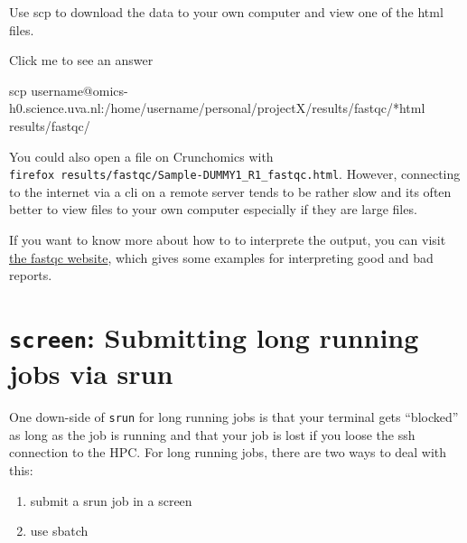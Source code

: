 \documentclass[
  letterpaper,
  DIV=11,
  numbers=noendperiod]{scrreprt}
\newenvironment{Shaded}{}{}
\newcommand{\FunctionTok}[1]{\textcolor[rgb]{0.44,0.26,0.76}{#1}}
\newcommand{\NormalTok}[1]{\textcolor[rgb]{0.14,0.16,0.18}{#1}}
\newcommand{\PreprocessorTok}[1]{\textcolor[rgb]{0.84,0.23,0.29}{#1}}
\providecommand{\tightlist}{%
  \setlength{\itemsep}{0pt}\setlength{\parskip}{0pt}}\usepackage{longtable,booktabs,array}
\begin{document}
\begin{tcolorbox}[enhanced jigsaw, coltitle=black, leftrule=.75mm, colback=white, toptitle=1mm, breakable, toprule=.15mm, colbacktitle=quarto-callout-caution-color!10!white, bottomtitle=1mm, arc=.35mm, opacitybacktitle=0.6, bottomrule=.15mm, titlerule=0mm, title=\textcolor{quarto-callout-caution-color}{\faFire}\hspace{0.5em}{Exercise}, rightrule=.15mm, left=2mm, colframe=quarto-callout-caution-color-frame, opacityback=0]

Use scp to download the data to your own computer and view one of the
html files.

Click me to see an answer

\begin{Shaded}
\begin{Highlighting}[]
\FunctionTok{scp}\NormalTok{ username@omics{-}h0.science.uva.nl:/home/username/personal/projectX/results/fastqc/}\PreprocessorTok{*}\NormalTok{html results/fastqc/}
\end{Highlighting}
\end{Shaded}

You could also open a file on Crunchomics with
\texttt{firefox\ results/fastqc/Sample-DUMMY1\_R1\_fastqc.html}.
However, connecting to the internet via a cli on a remote server tends
to be rather slow and its often better to view files to your own
computer especially if they are large files.

If you want to know more about how to to interprete the output, you can
visit
\href{https://www.bioinformatics.babraham.ac.uk/projects/fastqc/}{the
fastqc website}, which gives some examples for interpreting good and bad
reports.

\end{tcolorbox}

\section{\texorpdfstring{\texttt{screen}: Submitting long running jobs
via
srun}{screen: Submitting long running jobs via srun}}\label{screen-submitting-long-running-jobs-via-srun}

One down-side of \texttt{srun} for long running jobs is that your
terminal gets ``blocked'' as long as the job is running and that your
job is lost if you loose the ssh connection to the HPC. For long running
jobs, there are two ways to deal with this:

\begin{enumerate}
\def\labelenumi{\arabic{enumi}.}
\tightlist
\item
  submit a srun job in a screen
\item
  use sbatch
\end{enumerate}
\end{document}

